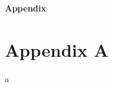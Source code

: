 \begin{center}
	\bigskip \bigskip \bigskip \bigskip
	{\huge \bf Appendix} \\
	\bigskip \bigskip
\end{center}

\section{Appendix A}

a